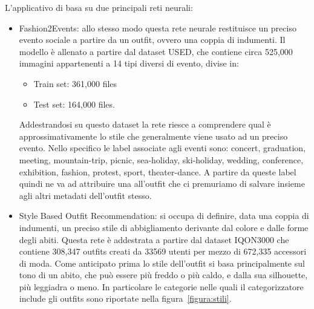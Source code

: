 L'applicativo di basa su due principali reti neurali:
\begin{itemize}
	
\item Fashion2Events: allo stesso modo questa rete neurale restituisce un preciso evento sociale a partire da un outfit, ovvero una coppia di indumenti. Il modello è allenato a partire dal dataset USED, che contiene circa 525,000 immagini appartenenti a 14 tipi diversi di evento, divise in:
\begin{itemize}
	\item Train set: 361,000 files 
	\item Test set: 164,000 files.
\end{itemize}

Addestrandosi su questo dataset la rete riesce a comprendere qual è approssimativamente lo stile che generalmente viene usato ad un preciso evento. Nello specifico le label associate agli eventi sono: concert, graduation, meeting, mountain-trip, picnic, sea-holiday, ski-holiday, wedding, conference, exhibition, fashion, protest, sport, theater-dance.
A partire da queste label quindi ne va ad attribuire una all'outfit che ci premuriamo di salvare insieme agli altri metadati dell'outfit stesso.
	
\item Style Based Outfit Recommendation: si occupa di definire, data una coppia di indumenti, un preciso stile di abbigliamento derivante dal colore e dalle forme degli abiti. Questa rete è addestrata a partire dal dataset IQON3000  che contiene 308,347 outfits creati da 33569 utenti per mezzo di 672,335 accessori di moda.
Come anticipato prima lo stile dell'outfit si basa principalmente sul tono di un abito, che può essere più freddo o più caldo, e dalla sua silhouette, più leggiadra o meno. In particolare le categorie nelle quali il categorizzatore include gli outfits sono riportate nella figura~\ref{figura:stili}.


\end{itemize}

